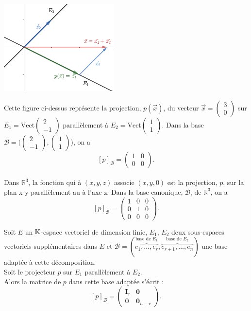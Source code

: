 \documentclass{book}
\begin{document}
\begin{Exemple}
\begin{center}
\includegraphics[width=6cm]{projecteur2d.png}
\end{center}
Cette figure ci-dessus   représente la projection, $p(\vec{x})$, du vecteur $\vec{x}=\begin{pmatrix}
3\\0
\end{pmatrix}$ sur $E_1=\mathrm{Vect}\begin{pmatrix}
2\\-1
\end{pmatrix}$ parallèlement à $E_2=\mathrm{Vect}\begin{pmatrix}
1\\1\end{pmatrix}$. Dans la base $\mathcal{B}=(\begin{pmatrix}
2\\-1
\end{pmatrix},\begin{pmatrix}
1\\1\end{pmatrix}$), on a 
$$ [p]_{\mathcal{B}} =\begin{pmatrix}1&0\\0&0\end{pmatrix}.$$
 \\
Dans $\mathbb {R}^3$, la fonction qui à $(x, y, z)$ associe $(x, y, 0)$ est la projection, $p$, sur la plan x-y parallèlement au à l'axe z. Dans la base canonique, $\mathcal{B}$, de  $\mathbb {R}^3$, on a 
$$ [p]_{\mathcal{B}}=\begin{pmatrix}1&0&0\\0&1&0\\0&0&0\end{pmatrix}.$$
\end{Exemple}
\begin{Proposition} Soit $E$ un $\mathbb{K} $-espace vectoriel de dimension finie, $E_1$, $E_2$ deux sous-espaces vectoriels supplémentaires dans $E$ et $\mathcal  {B}=(\overbrace{e_{1},\ldots ,e_{r}}^{\text{base de }E_1},\overbrace{e_{{r+1}},\ldots ,e_{n}}^{\text{base de }E_2})$ une base adaptée à cette décomposition.\\
Soit le projecteur $p$ sur $E_1$ parallèlement à $E_2$.\\  
Alors la matrice de $p$ dans cette base adaptée s'écrit :
$$[p]_{\mathcal{B}}=\begin{pmatrix}{\mathbf  {I}}_{{r}}&{\mathbf  {0}}\\{\mathbf  {0}}&{\mathbf  {0}}_{{n-r}}\end{pmatrix}.$$
\end{Proposition}
\end{document}
